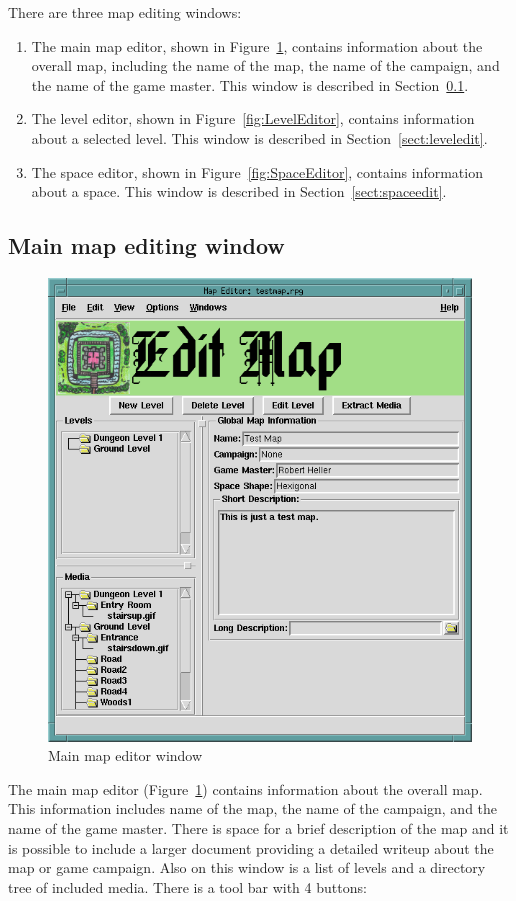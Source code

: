 There are three map editing windows:
\begin{enumerate}
\item The main map editor, shown in Figure~\ref{fig:MapEditor}, contains
information about the overall map, including the name of the map, the
name of the campaign, and the name of the game master.  This window is
described in Section~\ref{sect:mainmap}.
\item The level editor, shown in Figure~\ref{fig:LevelEditor}, contains
information about a selected level. This window is
described in Section~\ref{sect:leveledit}.
\item The space editor, shown in Figure~\ref{fig:SpaceEditor}, contains
information about a space. This window is
described in Section~\ref{sect:spaceedit}.
\end{enumerate}

\subsection{Main map editing window}
\label{sect:mainmap}

\begin{figure}[hbpt] 
\begin{centering}
\includegraphics[width=5in]{MapEditor.png}
\caption{Main map editor window}
\label{fig:MapEditor}
\end{centering}
\end{figure}
The main map editor (Figure~\ref{fig:MapEditor}) contains information
about the overall map.  This information includes name of the map, the
name of the campaign, and the name of the game master.  There is space
for a brief description of the map and it is possible to include a
larger document providing a detailed writeup about the map or game
campaign.  Also on this window is a list of levels and a directory tree
of included media.  There is a tool bar with 4 buttons:

